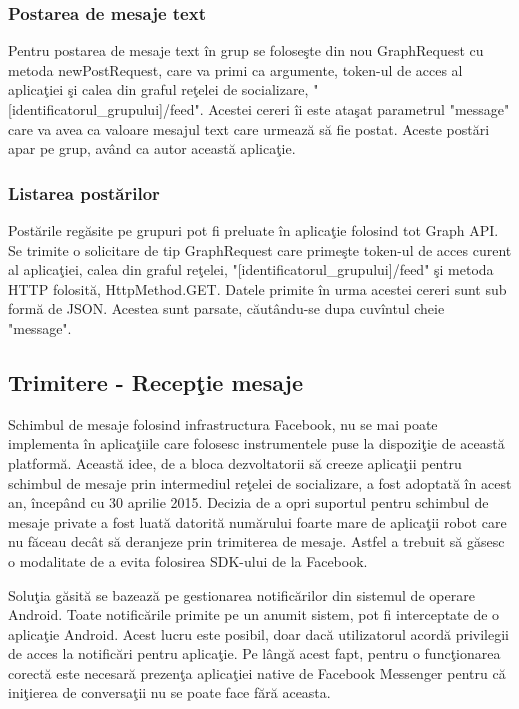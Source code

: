 \subsubsection{Postarea de mesaje text}

Pentru postarea de mesaje text \^{i}n grup se folose\c{s}te din nou GraphRequest cu metoda newPostRequest, care va primi ca argumente, token-ul de acces al aplica\c{t}iei \c{s}i calea din graful re\c{t}elei de socializare, "[identificatorul_grupului]/feed". Acestei cereri \^{i}i este ata\c{s}at parametrul "message" care va avea ca valoare mesajul text care urmeaz\u{a} s\u{a} fie postat. Aceste post\u{a}ri apar pe grup, av\^{a}nd ca autor aceast\u{a} aplica\c{t}ie. 

\subsubsection{Listarea post\u{a}rilor}

Post\u{a}rile reg\u{a}site pe grupuri pot fi preluate \^{i}n aplica\c{t}ie folosind tot Graph API. Se trimite o solicitare de tip GraphRequest care prime\c{s}te token-ul de acces curent al aplica\c{t}iei,  calea din graful re\c{t}elei, "[identificatorul_grupului]/feed" \c{s}i metoda HTTP folosit\u{a}, HttpMethod.GET. Datele primite \^{i}n urma acestei cereri sunt sub form\u{a} de JSON. Acestea sunt parsate, c\u{a}ut\^{a}ndu-se dupa cuv\^{i}ntul cheie "message".

\subsection{Trimitere - Recep\c{t}ie mesaje}

Schimbul de mesaje folosind infrastructura Facebook, nu se mai poate implementa \^{i}n aplica\c{t}iile care folosesc instrumentele puse la dispozi\c{t}ie de aceast\u{a} platform\u{a}. Aceast\u{a} idee, de a bloca dezvoltatorii s\u{a} creeze aplica\c{t}ii pentru schimbul de mesaje prin intermediul re\c{t}elei de socializare, a fost adoptat\u{a} \^{i}n acest an, \^{i}ncep\^{a}nd cu 30 aprilie 2015. Decizia de a opri suportul pentru schimbul de mesaje private a fost luat\u{a} datorit\u{a} num\u{a}rului foarte mare de aplica\c{t}ii robot care nu f\u{a}ceau dec\^{a}t s\u{a} deranjeze prin trimiterea de mesaje. Astfel a trebuit s\u{a} g\u{a}sesc o modalitate de a evita folosirea SDK-ului de la Facebook.

Solu\c{t}ia g\u{a}sit\u{a} se bazeaz\u{a} pe gestionarea notific\u{a}rilor din sistemul de operare Android. Toate notific\u{a}rile primite pe un anumit sistem, pot fi interceptate de o aplica\c{t}ie Android. Acest lucru este posibil, doar dac\u{a} utilizatorul acord\u{a} privilegii de acces la notific\u{a}ri pentru aplica\c{t}ie. Pe l\^{a}ng\u{a} acest fapt, pentru o func\c{t}ionarea corect\u{a} este necesar\u{a} prezen\c{t}a aplica\c{t}iei native de Facebook Messenger pentru c\u{a} ini\c{t}ierea de conversa\c{t}ii nu se poate face f\u{a}r\u{a} aceasta.

